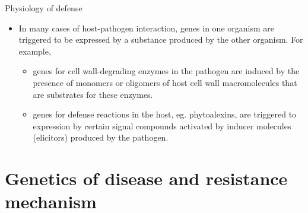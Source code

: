 \documentclass[11pt,dvipsnames,ignorenonframetext,aspectratio=169]{beamer}
\providecommand{\tightlist}{%
  \setlength{\itemsep}{0pt}\setlength{\parskip}{0pt}}
\begin{document}
\begin{frame}{Physiology of defense}
\protect\hypertarget{physiology-of-defense}{}
\begin{itemize}
\tightlist
\item
  In many cases of host-pathogen interaction, genes in one organism are
  triggered to be expressed by a substance produced by the other
  organism. For example,

  \begin{itemize}
  \tightlist
  \item
    genes for cell wall-degrading enzymes in the pathogen are induced by
    the presence of monomers or oligomers of host cell wall
    macromolecules that are substrates for these enzymes.
  \item
    genes for defense reactions in the host, eg. phytoalexins, are
    triggered to expression by certain signal compounds activated by
    inducer molecules (elicitors) produced by the pathogen.
  \end{itemize}
\end{itemize}
\end{frame}

\hypertarget{genetics-of-disease-and-resistance-mechanism}{%
\section{Genetics of disease and resistance
mechanism}\label{genetics-of-disease-and-resistance-mechanism}}
\end{document}

